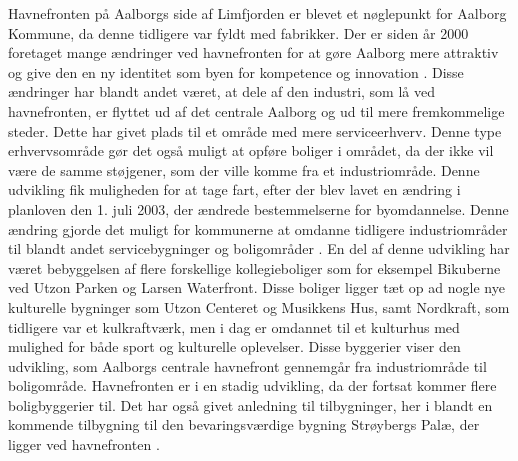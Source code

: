 \newline \indent{     }  Havnefronten på Aalborgs side af Limfjorden er blevet et nøglepunkt for Aalborg Kommune, da denne tidligere var fyldt med fabrikker. Der er siden år 2000 foretaget mange ændringer ved havnefronten for at gøre Aalborg mere attraktiv og give den en ny identitet som byen for kompetence og innovation \citep{brughavnen}.
\newline \indent{     }  Disse ændringer har blandt andet været, at dele af den industri, som lå ved havnefronten, er flyttet ud af det centrale Aalborg og ud til mere fremkommelige steder. Dette har givet plads til et område med mere serviceerhverv. Denne type erhvervsområde gør det også muligt at opføre boliger i området, da der ikke vil være de samme støjgener, som der ville komme fra et industriområde. Denne udvikling fik muligheden for at tage fart, efter der blev lavet en ændring i planloven den 1. juli 2003, der ændrede bestemmelserne for byomdannelse. Denne ændring gjorde det muligt for kommunerne at omdanne tidligere industriområder til blandt andet servicebygninger og boligområder \citep{sort}.
En del af denne udvikling har været bebyggelsen af flere forskellige kollegieboliger som for eksempel Bikuberne ved Utzon Parken og Larsen Waterfront. Disse boliger ligger tæt op ad nogle nye kulturelle bygninger som Utzon Centeret og Musikkens Hus, samt Nordkraft, som tidligere var et kulkraftværk, men i dag er omdannet til et kulturhus med mulighed for både sport og kulturelle oplevelser. Disse byggerier viser den udvikling, som Aalborgs centrale havnefront gennemgår fra industriområde til boligområde. Havnefronten er i en stadig udvikling, da der fortsat kommer flere boligbyggerier til. Det har også givet anledning til tilbygninger, her i blandt en kommende tilbygning til den bevaringsværdige bygning Strøybergs Palæ, der ligger ved havnefronten \citep{havnefronterne}.

